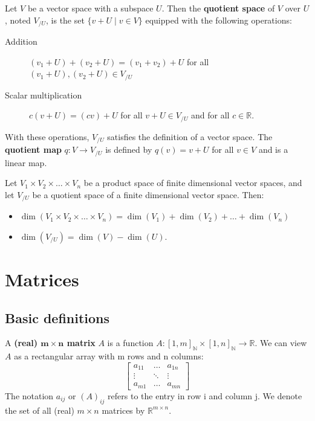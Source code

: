 \documentclass{bareminimum}
\begin{document}
	\begin{defn}
		Let  $V$ be a vector space with a subspace $U$. Then the \textbf{quotient space} of $V$ over $U$, noted $V_{/U}$, is the set $\{ v + U \mid v \in V \}$ equipped with the following operations:
		\begin{description}
			\item[Addition] $(v_1 + U) + (v_2 + U) = (v_1 + v_2) + U$ for all $(v_1+U), (v_2+U) \in V_{/U}$
			\item[Scalar multiplication] $c(v + U) = (cv) + U$ for all $v+U \in V_{/U}$ and for all $c \in \mathbb{R}$.
		\end{description}
		With these operations, $V_{/U}$ satisfies the definition of a vector space.
		The \textbf{quotient map} $q : V \to V_{/U}$ is defined by $q(v) = v + U$ for all $v \in V$ and is a linear map.
	\end{defn}
	
	\begin{prop}
		Let $V_1 \times V_2 \times \ldots \times V_n$ be a product space of finite dimensional vector spaces, and let $V_{/U}$ be a quotient space of a finite dimensional vector space. Then:
		\begin{itemize}
			\item $\dim(V_1 \times V_2 \times \ldots \times V_n) = \dim(V_1) + \dim(V_2) + \ldots + \dim(V_n)$
			\item $\dim(V_{/U}) = \dim(V) - \dim(U)$.
		\end{itemize}
	\end{prop}
	
	
	\section{Matrices}
	
	
	\subsection{Basic definitions}
	
	
	\begin{defn}[Matrix]
		A \textbf{(real) $\mathbf{m \times n}$ matrix}  $A$ is a function $A : [1,m]_{\mathbb{N}} \times [1,n]_{\mathbb{N}} \to \mathbb{R}$. We can view $A$ as a rectangular array with m rows and n columns:
		\begin{equation}
			\begin{bmatrix} 
				a_{11} & \ldots & a_{1n} \\  \vdots & \ddots & \vdots \\ a_{m1} & \ldots & a_{mn}
			\end{bmatrix}
		\end{equation}
		The notation $a_{ij}$ or $(A)_{ij}$ refers to the entry in row i and column j. We denote the set of all (real) $m \times n$ matrices by $\mathbb{R}^{m \times n}$.
	\end{defn}
	
\end{document}
